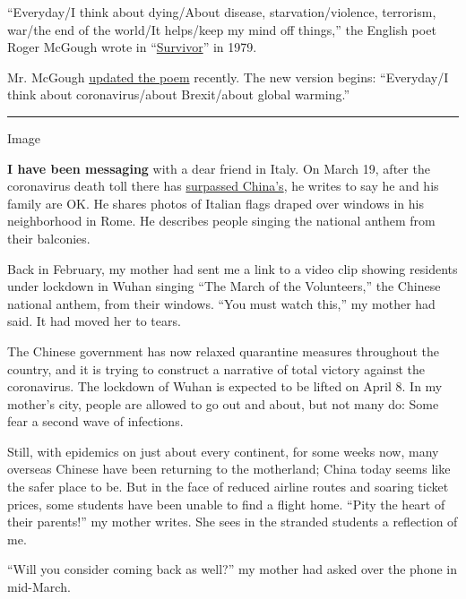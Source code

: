 ``Everyday/I think about dying/About disease, starvation/violence,
terrorism, war/the end of the world/It helps/keep my mind off things,''
the English poet Roger McGough wrote in
``\href{https://books.google.com/books?id=KaeZAAAAQBAJ\&pg=PT400\&lpg=PT400\&dq=roger+mcgough+survivor\&source=bl\&ots=sqJyACYeji\&sig=ACfU3U3BfNoqNT08dGHtj6_DMhkOtncQPQ\&hl=en\&sa=X\&ved=2ahUKEwipqu6PocPoAhUHVN8KHZI9DBI4FBDoATAAegQIChAB\#v=onepage\&q=roger\%20mcgough\%20survivor\&f=false}{Survivor}''
in 1979.

Mr. McGough \href{https://www.bbc.co.uk/sounds/play/p0860bqq}{updated
the poem} recently. The new version begins: ``Everyday/I think about
coronavirus/about Brexit/about global warming.''

\begin{center}\rule{0.5\linewidth}{\linethickness}\end{center}

Image

\textbf{I have been messaging} with a dear friend in Italy. On March 19,
after the coronavirus death toll there has \href{coronavirus}{surpassed
China's}, he writes to say he and his family are OK. He shares photos of
Italian flags draped over windows in his neighborhood in Rome. He
describes people singing the national anthem from their balconies.

Back in February, my mother had sent me a link to a video clip showing
residents under lockdown in Wuhan singing ``The March of the
Volunteers,'' the Chinese national anthem, from their windows. ``You
must watch this,'' my mother had said. It had moved her to tears.

The Chinese government has now relaxed quarantine measures throughout
the country, and it is trying to construct a narrative of total victory
against the coronavirus. The lockdown of Wuhan is expected to be lifted
on April 8. In my mother's city, people are allowed to go out and about,
but not many do: Some fear a second wave of infections.

Still, with epidemics on just about every continent, for some weeks now,
many overseas Chinese have been returning to the motherland; China today
seems like the safer place to be. But in the face of reduced airline
routes and soaring ticket prices, some students have been unable to find
a flight home. ``Pity the heart of their parents!'' my mother writes.
She sees in the stranded students a reflection of me.

``Will you consider coming back as well?'' my mother had asked over the
phone in mid-March.

